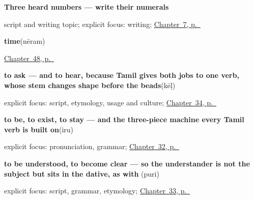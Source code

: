 \noindent\begin{minipage}[t]{\linewidth}
\raggedright
\textbf{Three heard numbers — write their numerals}\par
\footnotesize script and writing topic; explicit focus: writing; \hyperref[ch:ta-numbers-one-to-ten]{Chapter~7, p.~\pageref*{ch:ta-numbers-one-to-ten}}
\end{minipage}\par\smallskip

\noindent\begin{minipage}[t]{\linewidth}
\raggedright
\textbf{time}\enspace\emph{}\enspace(nēram)\par
\footnotesize \hyperref[ch:ta-setting-out]{Chapter~48, p.~\pageref*{ch:ta-setting-out}}
\end{minipage}\par\smallskip

\noindent\begin{minipage}[t]{\linewidth}
\raggedright
\textbf{to ask — and to hear, because Tamil gives both jobs to one verb, whose stem changes shape before the beads}\enspace\emph{}\enspace(kēḷ)\par
\footnotesize explicit focus: script, etymology, usage and culture; \hyperref[ch:ta-verbs-between-people]{Chapter~34, p.~\pageref*{ch:ta-verbs-between-people}}
\end{minipage}\par\smallskip

\noindent\begin{minipage}[t]{\linewidth}
\raggedright
\textbf{to be, to exist, to stay — and the three-piece machine every Tamil verb is built on}\enspace\emph{}\enspace(iru)\par
\footnotesize explicit focus: pronunciation, grammar; \hyperref[ch:ta-core-verbs]{Chapter~32, p.~\pageref*{ch:ta-core-verbs}}
\end{minipage}\par\smallskip

\noindent\begin{minipage}[t]{\linewidth}
\raggedright
\textbf{to be understood, to become clear — so the understander is not the subject but sits in the dative, as with }\enspace\emph{}\enspace(puri)\par
\footnotesize explicit focus: script, grammar, etymology; \hyperref[ch:ta-verbs-of-the-mind]{Chapter~33, p.~\pageref*{ch:ta-verbs-of-the-mind}}
\end{minipage}\par\smallskip

